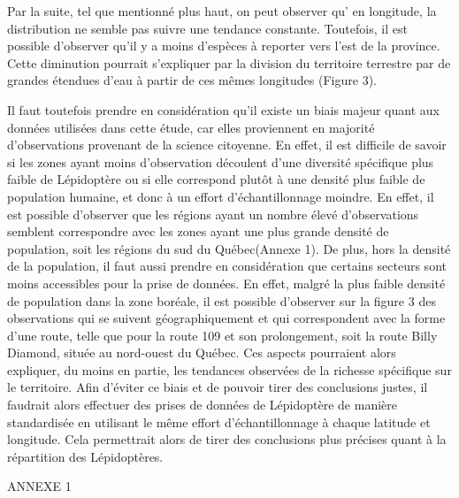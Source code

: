 \documentclass[conference,final,]{IEEEtran}
\begin{document}
Par la suite, tel que mentionné plus haut, on peut observer qu' en
longitude, la distribution ne semble pas suivre une tendance constante.
Toutefois, il est possible d'observer qu'il y a moins d'espèces à
reporter vers l'est de la province. Cette diminution pourrait
s'expliquer par la division du territoire terrestre par de grandes
étendues d'eau à partir de ces mêmes longitudes (Figure 3).

Il faut toutefois prendre en considération qu'il existe un biais majeur
quant aux données utilisées dans cette étude, car elles proviennent en
majorité d'observations provenant de la science citoyenne. En effet, il
est difficile de savoir si les zones ayant moins d'observation découlent
d'une diversité spécifique plus faible de Lépidoptère ou si elle
correspond plutôt à une densité plus faible de population humaine, et
donc à un effort d'échantillonnage moindre. En effet, il est possible
d'observer que les régions ayant un nombre élevé d'observations semblent
correspondre avec les zones ayant une plus grande densité de population,
soit les régions du sud du Québec(Annexe 1). De plus, hors la densité de
la population, il faut aussi prendre en considération que certains
secteurs sont moins accessibles pour la prise de données. En effet,
malgré la plus faible densité de population dans la zone boréale, il est
possible d'observer sur la figure 3 des observations qui se suivent
géographiquement et qui correspondent avec la forme d'une route, telle
que pour la route 109 et son prolongement, soit la route Billy Diamond,
située au nord-ouest du Québec. Ces aspects pourraient alors expliquer,
du moins en partie, les tendances observées de la richesse spécifique
sur le territoire. Afin d'éviter ce biais et de pouvoir tirer des
conclusions justes, il faudrait alors effectuer des prises de données de
Lépidoptère de manière standardisée en utilisant le même effort
d'échantillonnage à chaque latitude et longitude. Cela permettrait alors
de tirer des conclusions plus précises quant à la répartition des
Lépidoptères.

ANNEXE 1
\end{document}
